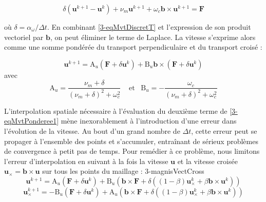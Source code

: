 \begin{refsection}
\begin{equation}
\label{3-eqMvtDiscretT}
\delta\left(\mathbf{u}^{k+1}-\mathbf{u}^{k}\right) + 
\nu_m\mathbf{u}^{k+1}+\omega_{c}\mathbf{b}\times\mathbf{u}^{k+1}=
\mathbf F
\end{equation}

où $\delta=\alpha_\omega/\Delta t$. En combinant \ref{3-eqMvtDiscretT} et
l'expression de son produit vectoriel par $\mathbf b$, on peut éliminer le
terme de Laplace. La vitesse s'exprime alors comme une somme pondérée du
transport perpendiculaire et du transport croisé :

\begin{equation}
\label{3-eqMvtPonderee1}
\mathbf{u}^{k+1}=\text{A}_u\left(\mathbf F + \delta\mathbf{u}^{k}\right)+
\text{B}_u\mathbf b\times\left(\mathbf F + \delta\mathbf{u}^{k}\right)
\end{equation}
avec 
\begin{equation}
\label{3-coefficientsVitesses}
\text{A}_u=\frac{\nu_m+\delta}{(\nu_m+\delta)^2+\omega_c^2}\;\;\;\;\text{et}\;\;\;\text{B}_u=-\frac{\omega_c}{(\nu_m+\delta)^2+\omega_c^2}
\end{equation}

L'interpolation spatiale nécessaire à l'évaluation du
deuxième terme de \eqref{3-eqMvtPonderee1} mène
inexorablement à l'introduction d'une erreur dans l'évolution de la vitesse. Au
bout d'un grand nombre de $\Delta t$, cette erreur peut se propager à
l'ensemble des points et s'accumuler, entraînant de sérieux problèmes de convergence à petit
pas de temps. Pour remédier à ce problème, nous limitons l'erreur
d'interpolation en suivant à la fois la vitesse $\mathbf u$ et la vitesse
croisée $\mathbf u_\times=\mathbf b\times\mathbf u$ sur tous les points du
maillage :
3-magnisVectCross
\begin{equation}
\label{3-eqMvtPonderee12}
\mathbf{u}^{k+1}=\text{A}_u\left(\mathbf F + \delta\mathbf{u}^{k}\right)+
\text{B}_u\left(\mathbf b\times\mathbf F +
\delta\left((1-\beta)\mathbf{u}_\times^{k}+\beta\mathbf
b\times\mathbf{u}^{k}\right)\right)
\end{equation}
\begin{equation}
\label{3-eqMvtPonderee2}
\mathbf{u}_\times^{k+1}=-\text{B}_u\left(\mathbf F +
\delta\mathbf{u}^{k}\right)+ \text{A}_u\left(\mathbf
b\times\mathbf F +
\delta\left((1-\beta)\mathbf{u}_\times^{k}+\beta\mathbf
b\times\mathbf{u}^{k}\right)\right)
\end{equation}


\end{refsection}
